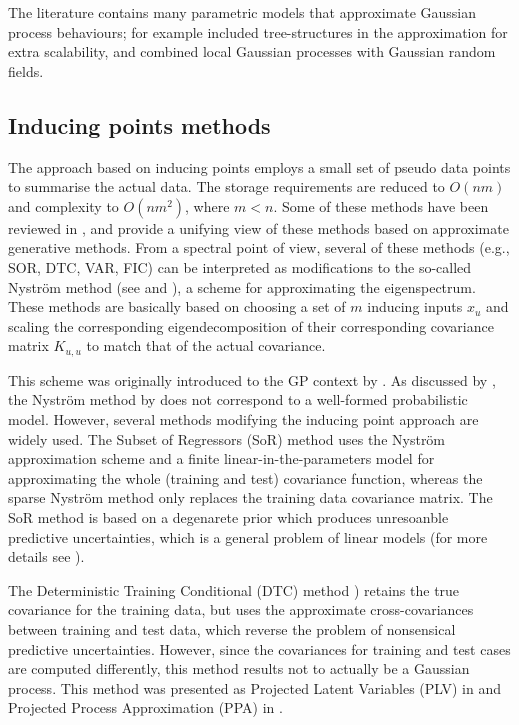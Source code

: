 \documentclass[]{interact}
\theoremstyle{plain}%
\theoremstyle{definition}
\theoremstyle{remark}
\begin{document}
The literature contains many parametric models that approximate Gaussian process behaviours; for example \cite{bui2014tree} included  tree-structures in the approximation for extra scalability, and \cite{moore2015gaussian} combined local Gaussian
processes with Gaussian random fields.

\subsection{Inducing points methods}

The approach based on inducing points employs a small set of pseudo data points to summarise the actual data. The storage requirements are reduced to $O(nm)$ and complexity to $O(nm^2)$, where $m < n$. Some of these methods have been reviewed in \cite{rasmussen2006gaussian}, and \cite{quinonero2005unifying} provide a unifying view of these methods based on approximate generative methods. From a spectral point of view, several of these methods (e.g., SOR, DTC, VAR, FIC) can be interpreted as modiﬁcations to the so-called Nystr\"om method (see \cite{arthur1979baker} and \cite{williams2001using}), a scheme for approximating the eigenspectrum. These methods are basically based on choosing a set of $m$ inducing inputs $x_u$ and scaling the corresponding eigendecomposition of their corresponding covariance matrix $K_{u,u}$ to match that of the actual covariance. 

This scheme was originally introduced to the GP context by \cite{williams2001using}. As discussed by \cite{quinonero2005unifying}, the Nystr\"om method by \cite{williams2001using} does not correspond to a well-formed probabilistic model. However, several methods modifying the inducing point approach are widely used. The Subset of Regressors (SoR) \citep{smola2001sparse} method uses the Nystr\"om approximation scheme and a finite linear-in-the-parameters model for approximating the whole (training and test) covariance function, whereas the sparse Nystr\"om method \citep{williams2001using} only replaces the training data covariance matrix. The SoR method is based on a degenarete prior which produces unresoanble predictive uncertainties, which is a general problem of linear models (for more details see \cite{rasmussen2006gaussian}). 

The Deterministic Training Conditional (DTC) method \citep{ro2001sparse,seeger2003fast}) retains the true covariance for the training data, but uses the approximate cross-covariances between training and test data, which reverse the problem of nonsensical predictive uncertainties. However, since the covariances for training and test cases are computed differently, this method results not to actually be a Gaussian process. This method was presented as Projected Latent Variables (PLV) in \cite{seeger2003fast} and Projected Process Approximation (PPA) in \cite{rasmussen2006gaussian}. 
\end{document}
